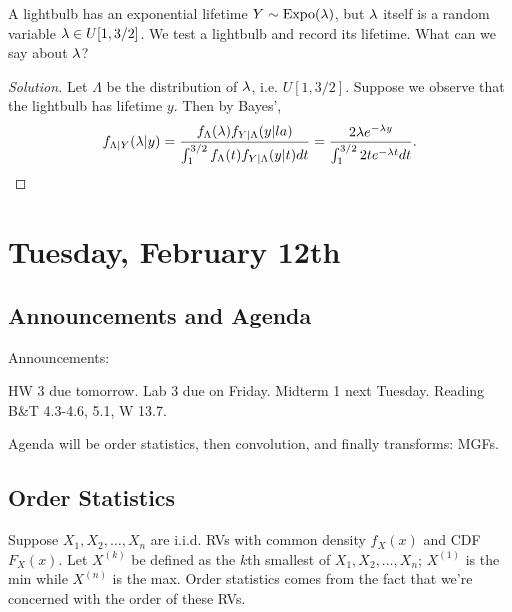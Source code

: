 \documentclass[11 pt]{scrartcl}
\begin{document}
\begin{example}
    A lightbulb has an exponential lifetime $Y\sim \text{Expo}(\lambda)$, but $\lambda$ itself is a random variable $\lambda \in U[1, 3/2]$. We test a lightbulb and record its lifetime. What can we say about $\lambda$? 
\begin{proof}[Solution]
    Let $\Lambda$ be the distribution of $\lambda$, i.e. $U[1, 3/2]$. Suppose we observe that the lightbulb has lifetime $y$. Then by Bayes', 
    \[ f_{\Lambda|Y}(\lambda | y) = \dfrac{f_{\Lambda}(\lambda) f_{Y|\Lambda}(y|la)}{\int_1^{3/2} f_{\Lambda}(t) f_{Y|\Lambda}(y|t)dt } = \dfrac{2\lambda e^{-\lambda y}}{\int_1^{3/2}2te^{-\lambda t}dt}. \]
\end{proof}
\end{example}

\newpage
\section{Tuesday, February 12th}
\subsection{Announcements and Agenda}
Announcements: 
\begin{enumerate}
    \ii HW 3 due tomorrow. 
    \ii Lab 3 due on Friday. 
    \ii Midterm 1 next Tuesday. 
    \ii Reading B\&T 4.3-4.6, 5.1, W 13.7. 
\end{enumerate}

Agenda will be order statistics, then convolution, and finally transforms: MGFs. 

\subsection{Order Statistics}
Suppose $X_1, X_2, \dots, X_n$ are i.i.d. RVs with common density $f_X(x)$ and CDF $F_X(x)$. Let $X^{(k)}$ be defined as the $k$th smallest of $X_1, X_2, \dots, X_n$; $X^{(1)}$ is the min while $X^{(n)}$ is the max. Order statistics comes from the fact that we're concerned with the order of these RVs. 
\end{document}
